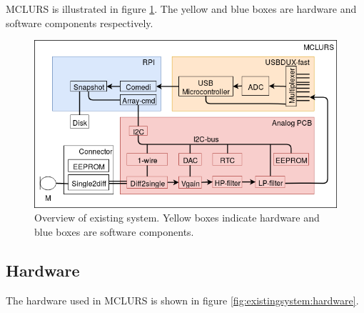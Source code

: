MCLURS is illustrated in figure \ref{fig:existingsystem:overview}. The yellow and blue boxes are hardware and software components respectively.


\begin{figure}[h!]
	\centering
	\includegraphics[width=1\textwidth]{figures/existing-system-overview.png} 
	\caption{Overview of existing system. Yellow boxes indicate hardware and blue boxes are software components.}\label{fig:existingsystem:overview}
\end{figure}

\subsection{Hardware}
The hardware used in MCLURS is shown in figure \ref{fig:existingsystem:hardware}.

